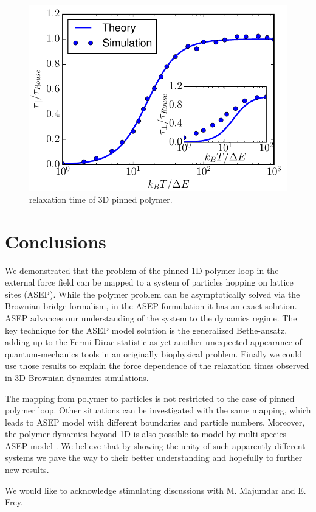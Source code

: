 \documentclass[aps,showpacs,twocolumn,floatfix,prx,superscriptaddress]{revtex4-1}
\begin{document}
\begin{figure}[htpb]
    \centering
    \includegraphics[width=1.0\linewidth]{relaxation3D}
    \caption{relaxation time of 3D pinned polymer.}
    \label{fig:relaxation3D}
\end{figure}
 
\section{Conclusions}
We demonstrated that the problem of the pinned 1D polymer loop in the external force field can be mapped to a system of
particles hopping on lattice sites (ASEP). While the polymer problem can be asymptotically solved via the Brownian bridge formalism, in the ASEP formulation it has an exact solution. ASEP advances our understanding of the system to the dynamics regime. The key technique for the ASEP model solution is the generalized Bethe-ansatz, adding up to the Fermi-Dirac statistic as yet another unexpected appearance of quantum-mechanics tools in an originally biophysical problem. Finally we could use those results to explain the force dependence of the relaxation times observed in 3D Brownian dynamics simulations.

The mapping from polymer to particles is not restricted to the case of pinned polymer loop. Other situations can be investigated with the same mapping, which leads to ASEP model with different boundaries and particle numbers. Moreover, the polymer dynamics beyond 1D is also possible to
model by multi-species ASEP model \cite{}. We believe that by showing the unity of such apparently different systems we pave the way to their better understanding and hopefully to further new results.
\begin{acknowledgments}
We would like to acknowledge stimulating discussions with M. Majumdar and E. Frey.

\end{acknowledgments}
\end{document}
